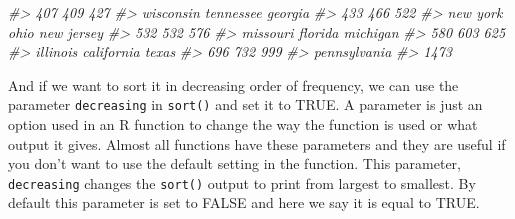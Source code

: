 \documentclass[
  12pt,
]{book}
\newenvironment{Shaded}{\begin{snugshade}}{\end{snugshade}}
\newcommand{\CommentTok}[1]{\textcolor[rgb]{0.37,0.37,0.37}{\textit{#1}}}
\begin{document}
\begin{Shaded}
\begin{Highlighting}[]
\CommentTok{\#\textgreater{}                  407                  409                  427 }
\CommentTok{\#\textgreater{}            wisconsin            tennessee              georgia }
\CommentTok{\#\textgreater{}                  433                  466                  522 }
\CommentTok{\#\textgreater{}             new york                 ohio           new jersey }
\CommentTok{\#\textgreater{}                  532                  532                  576 }
\CommentTok{\#\textgreater{}             missouri              florida             michigan }
\CommentTok{\#\textgreater{}                  580                  603                  625 }
\CommentTok{\#\textgreater{}             illinois           california                texas }
\CommentTok{\#\textgreater{}                  696                  732                  999 }
\CommentTok{\#\textgreater{}         pennsylvania }
\CommentTok{\#\textgreater{}                 1473}
\end{Highlighting}
\end{Shaded}

And if we want to sort it in decreasing order of frequency, we can use the parameter \texttt{decreasing} in \texttt{sort()} and set it to TRUE. A parameter is just an option used in an R function to change the way the function is used or what output it gives. Almost all functions have these parameters and they are useful if you don't want to use the default setting in the function. This parameter, \texttt{decreasing} changes the \texttt{sort()} output to print from largest to smallest. By default this parameter is set to FALSE and here we say it is equal to TRUE.
\end{document}
